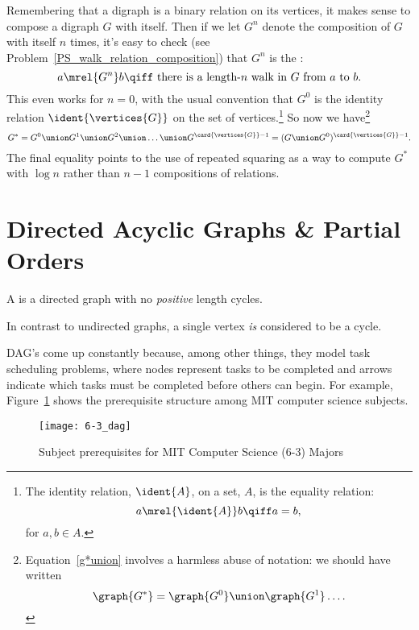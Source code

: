 Remembering that a digraph is a binary relation on its vertices, it
makes sense to compose a digraph $G$ with itself.  Then if we let
$G^n$ denote the composition of $G$ with itself $n$ times, it's easy
to check (see Problem~\ref{PS_walk_relation_composition}) that $G^n$
is the :
\[
a  \mrel{G^n} b \qiff \mbox{ there is a length-$n$ walk in $G$ from $a$ to $b$}.
\]
This even works for $n=0$, with the usual convention that $G^0$ is the
identity relation $\ident{\vertices{G}}$ on the set of
vertices.\footnote{The identity relation, $\ident{A}$, on a set, $A$,
  is the equality relation:
\[
a \mrel{\ident{A}} b \qiff a  = b,
\]
for $a,b \in A$.}
So now we have\footnote{Equation~\eqref{g*union} involves a harmless
  abuse of notation: we should have written
\[
\graph{G^*} = \graph{G^0} \union \graph{G^1} \dots.
\]
}
\begin{equation}\label{g*union}
G^* = G^0 \union G^1 \union G^2 \union \dots \union G^{\card{\vertices{G}}-1} = (G \union G^0)^{\card{\vertices{G}}-1}.
\end{equation}
The final equality points to the use of repeated squaring as a way to
compute $G^*$ with $\log n$ rather than $n-1$ compositions of
relations.

\section{Directed Acyclic Graphs \& Partial Orders}\label{dag_sec}

\begin{definition}
A  is a directed graph
with no \emph{positive} length cycles.
\end{definition}

\begin{staffnotes}

In contrast to undirected graphs, a single vertex \emph{is} considered to
be a cycle.

\end{staffnotes}

DAG's come up constantly because, among other things, they model task
scheduling problems, where nodes represent tasks to be completed and
arrows indicate which tasks must be completed before others can begin.
For example, Figure~\ref{6-3_subjects} shows the prerequisite
structure among MIT computer science subjects.

\begin{figure}

\texttt{[image: 6-3\_dag]}

\caption{Subject prerequisites for MIT Computer Science (6-3) Majors}

\label{6-3_subjects}

\end{figure}

